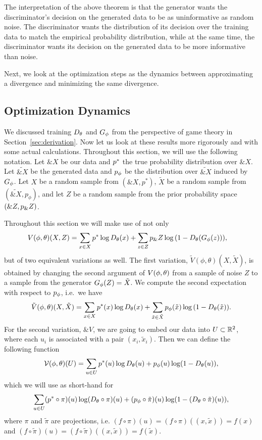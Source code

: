 The interpretation of the above theorem is that the generator wants the
discriminator's decision on the generated data to be as uninformative as random
noise. The discriminator wants the distribution of its decision over the
training data to match the empirical probability distribution, while at the same
time, the discriminator wants its decision on the generated data to be more
informative than noise.

Next, we look at the optimization steps as the dynamics between approximating a
divergence and minimizing the same divergence.

\subsection{Optimization Dynamics}%
\label{sec:optimization-dynamics}

We discussed training $D_\theta$ and $G_\phi$ from the perspective of game theory in
Section~\ref{sec:derivation}. Now let us look at these results more rigorously
and with some actual calculations. Throughout this section, we will use the
following notation. Let $\&X$ be our data and $p^*$ the true probability
distribution over $\&X$. Let $\tilde{\&X}$ be the generated data and $p_{\phi}$ be
the distribution over $\tilde{\&X}$ induced by $G_\phi$. Let $X$ be a random sample
from $(\&X, p^*)$, $\tilde{X}$ be a random sample from $(\tilde{\&X}, p_\phi)$,
and let $Z$ be a random sample from the prior probability space $(\&Z, p_\&Z)$.

Throughout this section we will make use of not only
\begin{align}
  V(\phi, \theta)(X, Z) & = \sum_{x \in X}p^*\log{D_\theta(x)} +
                          \sum_{z \in Z}p_\&Z\log{(1 - D_\theta(G_\phi(z)))},
\end{align}
but of two equivalent variations as well. The first variation, $\tilde{V}(\phi,
\theta)(X, \tilde{X})$, is obtained by changing the second argument of $V(\phi, \theta)$ from
a sample of noise $Z$ to a sample from the generator $G_\phi(Z) = \tilde{X}$. We
compute the second expectation with respect to $p_{\phi}$, i.e.\ we have
\begin{align}
  \tilde{V}(\phi, \theta)(X, \tilde{X}) = \sum_{x \in X}p^*(x)\log{D_\theta(x)} + \sum_{\tilde{x} \in\tilde{X}}p_{\phi}(\tilde{x})\log{(1 - D_\theta(\tilde{x}))}.
\end{align}
For the second variation, $\&V$, we are going to embed our data into
$U \subset \mathbb{R}^2$, where each $u_i$ is associated with a pair
$(x_i, \tilde{x}_i)$. Then we can define the following function
\begin{align}
  \label{eq:joined}
  \mathcal{V}(\phi, \theta)(U) = \sum_{u \in U} p^*(u) \log D_\theta(u) + p_{\phi}(u) \log(1 - D_\theta(u)),
\end{align}
which we will use as short-hand for
\begin{align}
  \label{eq:joined-verbose}
  \sum_{u \in U} (p^* \circ \pi)(u)\log (D_\theta \circ \pi)(u) + (p_{\phi} \circ \tilde{\pi})(u) \log(1 - (D_\theta \circ \tilde{\pi})(u)),
\end{align}
where $\pi$ and $\tilde{\pi}$ are projections, i.e. $(f \circ \pi)(u) = (f
\circ \pi)((x, \tilde{x})) = f(x)$ and $(f \circ \tilde{\pi})(u) = (f
\circ \tilde{\pi})((x, \tilde{x})) = f(\tilde{x})$.

